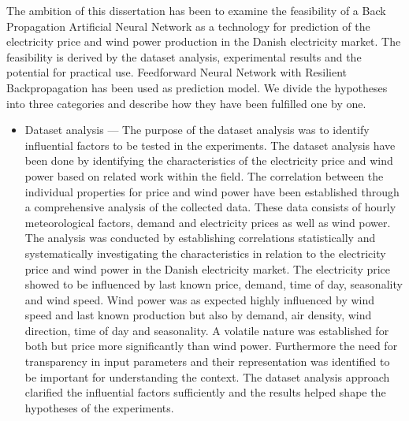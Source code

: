The ambition of this dissertation has been to examine the feasibility of a Back Propagation Artificial Neural Network as a technology for prediction of the electricity price and wind power production in the Danish electricity market. The feasibility is derived by the dataset analysis, experimental results and the potential for practical use. Feedforward Neural Network with Resilient Backpropagation has been used as prediction model. We divide the hypotheses into three categories and describe how they have been fulfilled one by one.

\begin{itemize}
\item Dataset analysis --- The purpose of the dataset analysis was to identify influential factors to be tested in the experiments. The dataset analysis have been done by identifying the characteristics of the electricity price and wind power based on related work within the field. The correlation between the individual properties for price and wind power have been established through a comprehensive analysis of the collected data. These data consists of hourly meteorological factors, demand and electricity prices as well as wind power. The analysis was conducted by establishing correlations statistically and systematically investigating the characteristics in relation to the electricity price and wind power in the Danish electricity market. The electricity price showed to be influenced by last known price, demand, time of day, seasonality and wind speed. Wind power was as expected highly influenced by wind speed and last known production but also by demand, air density, wind direction, time of day and seasonality. A volatile nature was established for both but price more significantly than wind power. Furthermore the need for transparency in input parameters and their representation was identified to be important for understanding the context. The dataset analysis approach clarified the influential factors sufficiently and the results helped shape the hypotheses of the experiments. 

\end{itemize}
